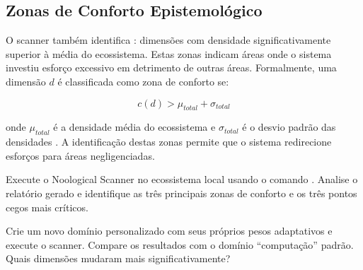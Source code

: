 \begin{table}[htb]
\centering
    \small
\caption{Exemplo de correlação cruzada entre dimensões}
\label{tab:correlacao-cruzada}
\end{table}

\subsection{Zonas de Conforto Epistemológico}

O scanner também identifica :
dimensões com densidade significativamente superior à média do ecossistema.
Estas zonas indicam áreas onde o sistema investiu esforço excessivo em
detrimento de outras áreas. Formalmente, uma dimensão $d$ é classificada
como zona de conforto se:

\begin{equation}
c(d) > \mu_{total} + \sigma_{total}
\end{equation}

onde $\mu_{total}$ é a densidade média do ecossistema e $\sigma_{total}$ é
o desvio padrão das densidades \cite{cohen2018estatistica}. A identificação
destas zonas permite que o sistema redirecione esforços para áreas
negligenciadas.

\begin{exercicio}
Execute o Noological Scanner no ecossistema local usando o comando
. Analise o relatório gerado e identifique as três
principais zonas de conforto e os três pontos cegos mais críticos.
\end{exercicio}

\begin{exercicio}
Crie um novo domínio personalizado com seus próprios pesos adaptativos
e execute o scanner. Compare os resultados com o domínio ``computação''
padrão. Quais dimensões mudaram mais significativamente?
\end{exercicio}

